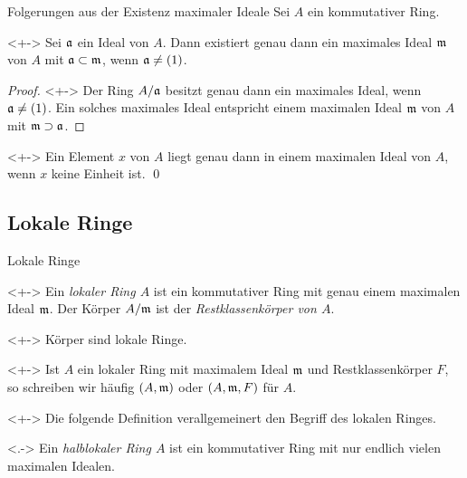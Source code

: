 \begin{frame}{Folgerungen aus der Existenz maximaler Ideale}
    Sei \(A\) ein kommutativer Ring.
    \begin{corollary}<+->
        Sei \(\mathfrak{a}\) ein Ideal von \(A\). Dann existiert genau dann ein
        maximales Ideal \(\mathfrak{m}\) von \(A\) mit \(\mathfrak{a} \subset \mathfrak{m}\),
        wenn \(\mathfrak{a} \neq (1)\).
    \end{corollary}
    \begin{proof}<+->
        Der Ring \(A/\mathfrak{a}\) besitzt genau dann ein maximales Ideal, wenn
        \(\mathfrak{a} \neq (1)\). Ein solches maximales Ideal entspricht einem maximalen
        Ideal \(\mathfrak{m}\) von \(A\) mit \(\mathfrak{m} \supset \mathfrak{a}\).
    \end{proof}
    \begin{corollary}<+->
        Ein Element \(x\) von \(A\) liegt genau dann in einem maximalen Ideal von
        \(A\), wenn \(x\) keine Einheit ist.
        \qed
    \end{corollary}
\end{frame}

\subsection{Lokale Ringe}

\begin{frame}{Lokale Ringe}
    \begin{definition}<+->
        Ein \emph{lokaler Ring \(A\)} ist ein kommutativer Ring mit genau einem
        maximalen Ideal \(\mathfrak{m}\). Der Körper \(A/\mathfrak{m}\) ist der
        \emph{Restklassenkörper von \(A\)}.
    \end{definition}
    \begin{example}<+->
        Körper sind lokale Ringe.
    \end{example}
    \begin{notation}<+->
        Ist \(A\) ein lokaler Ring mit maximalem Ideal \(\mathfrak{m}\) und
        Restklassenkörper \(F\), so schreiben wir häufig \((A, \mathfrak{m})\) oder
        \((A, \mathfrak{m}, F)\) für \(A\).
    \end{notation}
    \begin{visibleenv}<+->
        Die folgende Definition verallgemeinert den Begriff des lokalen Ringes.
    \end{visibleenv}
    \begin{definition}<.->
        Ein \emph{halblokaler Ring \(A\)} ist ein kommutativer Ring mit nur
        endlich vielen maximalen Idealen.
    \end{definition}
\end{frame}

